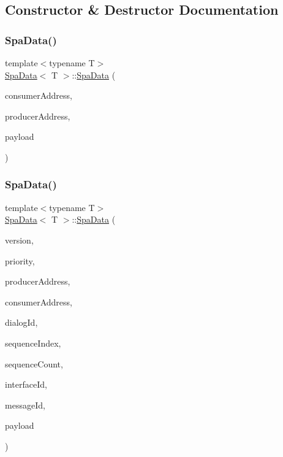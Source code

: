 \subsection{Constructor \& Destructor Documentation}
\mbox{\label{structSpaData_a5039d8b49c2afb236fdaacc27341f8ce}} 
\subsubsection{\texorpdfstring{Spa\+Data()}{SpaData()}\hspace{0.1cm}{\footnotesize\ttfamily [1/2]}}
{\footnotesize\ttfamily template$<$typename T$>$ \\
\hyperlink{structSpaData}{Spa\+Data}$<$ T $>$\+::\hyperlink{structSpaData}{Spa\+Data} (\begin{DoxyParamCaption}\item[{\hyperlink{structLogicalAddress}{Logical\+Address}}]{consumer\+Address,  }\item[{\hyperlink{structLogicalAddress}{Logical\+Address}}]{producer\+Address,  }\item[{T}]{payload }\end{DoxyParamCaption})\hspace{0.3cm}{\ttfamily [inline]}}

\mbox{\label{structSpaData_ae9bf86197e7b21b5a37a1e1b2de76320}} 
\subsubsection{\texorpdfstring{Spa\+Data()}{SpaData()}\hspace{0.1cm}{\footnotesize\ttfamily [2/2]}}
{\footnotesize\ttfamily template$<$typename T$>$ \\
\hyperlink{structSpaData}{Spa\+Data}$<$ T $>$\+::\hyperlink{structSpaData}{Spa\+Data} (\begin{DoxyParamCaption}\item[{uint8\+\_\+t}]{version,  }\item[{uint8\+\_\+t}]{priority,  }\item[{\hyperlink{structLogicalAddress}{Logical\+Address}}]{producer\+Address,  }\item[{\hyperlink{structLogicalAddress}{Logical\+Address}}]{consumer\+Address,  }\item[{uint16\+\_\+t}]{dialog\+Id,  }\item[{uint16\+\_\+t}]{sequence\+Index,  }\item[{uint16\+\_\+t}]{sequence\+Count,  }\item[{uint8\+\_\+t}]{interface\+Id,  }\item[{uint8\+\_\+t}]{message\+Id,  }\item[{T}]{payload }\end{DoxyParamCaption})\hspace{0.3cm}{\ttfamily [inline]}}



